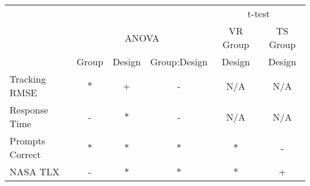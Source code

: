 \begin{tabular}{@{}lccc|cc@{}}
\toprule
                & & & & \multicolumn{2}{c}{t-test} \\
                & \multicolumn{3}{c|}{ANOVA} & VR Group & TS Group \\
                & Group & Design & Group:Design & Design   & Design   \\
\midrule
Tracking RMSE   & $*$ & +   &  -  & \small N/A & \small N/A \\
Response Time   &  -  & $*$  &  -  & \small N/A & \small N/A \\
Prompts Correct & $*$ & $*$ & $*$ & $*$ & - \\
NASA TLX        &  -  & $*$ & $*$  & $*$ & + \\
\bottomrule
\end{tabular}
